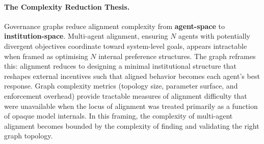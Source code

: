 \documentclass[11pt, a4paper]{article}
\begin{document}
\paragraph{The Complexity Reduction Thesis.}
Governance graphs reduce alignment complexity from \textbf{agent-space} to \textbf{institution-space}. Multi-agent alignment, ensuring $N$ agents with potentially divergent objectives coordinate toward system-level goals, appears intractable when framed as optimising $N$ internal preference structures. The graph reframes this: alignment reduces to designing a minimal institutional structure that reshapes external incentives such that aligned behavior becomes each agent’s best response. Graph complexity metrics (topology size, parameter surface, and enforcement overhead) provide tractable measures of alignment difficulty that were unavailable when the locus of alignment was treated primarily as a function of opaque model internals. In this framing, the complexity of multi-agent alignment becomes bounded by the complexity of finding and validating the right graph topology.
\end{document}
